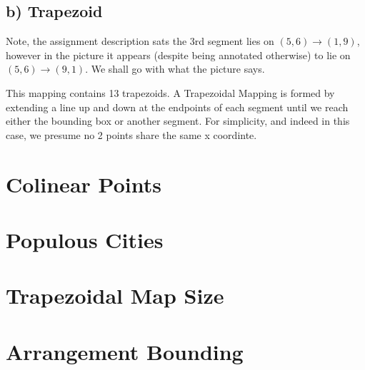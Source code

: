 \documentclass{article}
\begin{document}
\subsection{b) Trapezoid}
Note, the assignment description sats the 3rd segment lies on $(5,6) \rightarrow (1,9)$, however in the picture it appears (despite being annotated otherwise) to lie on $(5,6) \rightarrow (9,1)$.
We shall go with what the picture says.

This mapping contains 13 trapezoids.
A Trapezoidal Mapping is formed by extending a line up and down at the endpoints of each segment until we reach either the bounding box or another segment.
For simplicity, and indeed in this case, we presume no 2 points share the same x coordinte.

\section {Colinear Points}

\section {Populous Cities}

\section {Trapezoidal Map Size}

\section {Arrangement Bounding}
\end{document}
